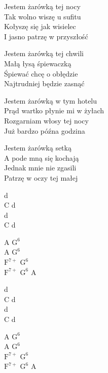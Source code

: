 \begin{text}
    Jestem żarówką tej nocy\\
    Tak wolno wiszę u sufitu\\
    Kołyszę się jak wisielec\\
    I jasno patrzę w przyszłość

    Jestem żarówką tej chwili\\
    Małą łysą śpiewaczką\\
    Śpiewać chcę o obłędzie\\
    Najtrudniej będzie zasnąć

    Jestem żarówką w tym hotelu\\
    Prąd wartko płynie mi w żyłach\\
    Rozgarniam włosy tej nocy\\
    Już bardzo późna godzina

    Jestem żarówką setką\\
    A pode mną się kochają\\
    Jednak mnie nie zgasili\\
    Patrzę w oczy tej małej
\end{text}
\begin{chord}
    d\\
    C d\\
    d\\
    C d

    A $\mathrm{G^{6}}$\\
    A $\mathrm{G^{6}}$\\
    $\mathrm{F^{7+}}$ $\mathrm{G^{6}}$\\
    $\mathrm{F^{7+}}$ $\mathrm{G^{6}}$ A

    d\\
    C d\\
    d\\
    C d

    A $\mathrm{G^{6}}$\\
    A $\mathrm{G^{6}}$\\
    $\mathrm{F^{7+}}$ $\mathrm{G^{6}}$\\
    $\mathrm{F^{7+}}$ $\mathrm{G^{6}}$ A
\end{chord}
